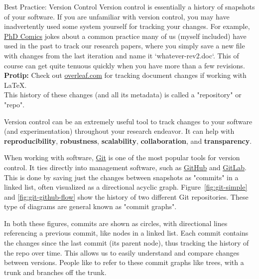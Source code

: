 \documentclass[final]{beamer}
\newlength{\colwidth}
\begin{document}
\begin{frame}[t]
\begin{columns}[t]
\begin{column}{\colwidth}
\begin{block}{Best Practice: Version Control}
    Version control is essentially a history of snapshots of your software.
    If you are unfamiliar with version control, you may have inadvertently used
    some system yourself for tracking your changes.
    For example,
    \href{https://phdcomics.com/comics/archive.php?comicid=1531}{PhD Comics}\cite{phdcomics}
    jokes about a common practice many of us (myself included) have used in the
    past to track our research papers, where you simply save a new file with
    changes from the last iteration and name it `whatever-rev2.doc`.
    This of course can get quite tenuous quickly when you have more than a few
    revisions.
    \\ \vspace{0.5em}
    \textbf{Protip:} Check out \href{overleaf.com}{overleaf.com} for tracking
    document changes if working with LaTeX.
    \\ \vspace{0.5em}
    This history of these changes (and all its metadata) is called a
    "repository" or "repo".

    Version control can be an extremely useful tool to track changes to your
    software (and experimentation) throughout your research endeavor.
    It can help with \textbf{reproducibility}, \textbf{robustness},
    \textbf{scalability}, \textbf{collaboration}, and \textbf{transparency}.

    When working with software, \href{https://git-scm.com/}{Git} is one of the
    most popular tools for version control.
    It ties directly into management software, such as
    \href{https://github.com}{GitHub} and \href{https://gitlab.com}{GitLab}.
    This is done by saving just the changes between snapshots as "commits" in
    a linked list, often visualized as a directional acyclic graph.
    Figure~\ref{fig:git-simple} and \ref{fig:git-github-flow} show the history
    of two different Git repositories.
    These type of diagrams are general known as "commit graphs".
    
    In both these figures, commits are shown as circles, with directional lines
    referencing a previous commit, like nodes in a linked list.
    Each commit contains the changes since the last commit (its parent node),
    thus tracking the history of the repo over time.
    This allows us to easily understand and compare changes between versions.
    People like to refer to these commit graphs like trees, with a trunk and
    branches off the trunk.


\end{block}
\end{column}
\end{columns}
\end{frame}
\end{document}
